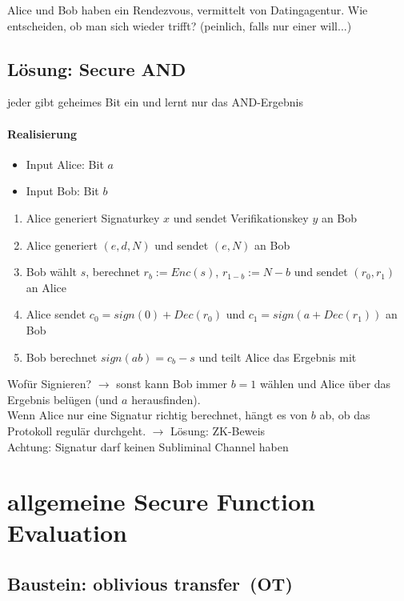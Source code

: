 \documentclass[a4paper,twoside,DIV15,BCOR12mm]{scrbook}
\begin{document}
Alice und Bob haben ein Rendezvous, vermittelt von Datingagentur. Wie entscheiden, ob man sich wieder trifft? (peinlich, falls nur einer will...)

\subsection{Lösung: Secure AND}

jeder gibt geheimes Bit ein und lernt nur das AND-Ergebnis

\paragraph{Realisierung}

\begin{itemize}
	\item Input Alice: Bit $a$
	\item Input Bob: Bit $b$
\end{itemize}

\begin{enumerate}
	\item Alice generiert Signaturkey $x$ und sendet Verifikationskey $y$ an Bob
	\item Alice generiert $(e,d,N)$ und sendet $(e,N)$ an Bob
	\item Bob wählt $s$, berechnet $r_b:= Enc(s)$, $r_{1-b} := N-b$ und sendet $(r_0, r_1)$ an Alice
	\item Alice sendet $c_0 = sign(0) + Dec(r_0)$ und $c_1 = sign(a + Dec(r_1))$ an Bob
	\item Bob berechnet $sign(ab) = c_b - s$ und teilt Alice das Ergebnis mit
\end{enumerate}

Wofür Signieren? $\rightarrow$ sonst kann Bob immer $b = 1$ wählen und Alice über das Ergebnis belügen (und $a$ herausfinden).\\ Wenn Alice nur eine Signatur richtig berechnet, hängt es von $b$ ab, ob das Protokoll regulär durchgeht. $\rightarrow$ Lösung: ZK-Beweis\\

Achtung: Signatur darf keinen Subliminal Channel haben

\section{allgemeine Secure Function Evaluation}

\subsection{Baustein: \glqq oblivious transfer\grqq\ (OT)}
\end{document}
